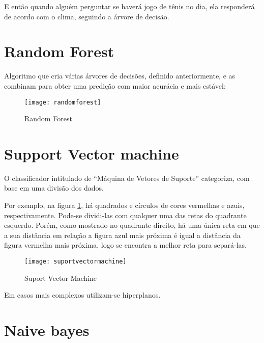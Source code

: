 E então quando alguém perguntar se haverá jogo de tênis no dia, ela responderá de acordo com o clima, seguindo a árvore de decisão.

\section{\textbf{Random Forest}}

Algoritmo que cria várias árvores de decisões, definido anteriormente, e as combinam para obter uma predição com maior acurácia e mais estável:



\begin{figure}[!htb]
\begin{center}
\caption{Random Forest}
\texttt{[image: randomforest]}
\end{center}
\cite{RANDOMFOREST}
\end{figure}



\section{\textbf{Support Vector machine}}

O classificador intitulado de “Máquina de Vetores de Suporte” categoriza, com base em uma divisão dos dados. 

Por exemplo, na figura \ref{fig:suportvectormachine}, há quadrados e círculos de cores vermelhas e azuis, respectivamente.
Pode-se dividi-las com qualquer uma das retas do quadrante esquerdo.
Porém, como mostrado no quadrante direito,
há uma única reta em que a sua distância em relação a figura azul mais próxima é igual a distância da figura vermelha mais próxima,
logo se encontra a melhor reta para separá-las.


\begin{figure}[!htb]
\begin{center}
\caption{Suport Vector Machine}
\texttt{[image: suportvectormachine]}
\label{fig:suportvectormachine}
\end{center}
\cite{SVM}
\end{figure}

Em casos mais complexos utilizam-se hiperplanos.


\section{\textbf{Naive bayes}}

